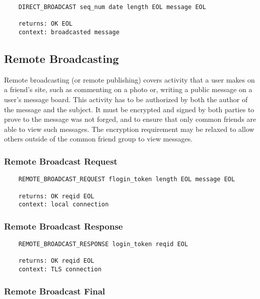 \documentclass[letterpaper,11pt,oneside]{article}
\begin{document}
\vspace{10pt}
\begin{verbatim}
    DIRECT_BROADCAST seq_num date length EOL message EOL

    returns: OK EOL
    context: broadcasted message
\end{verbatim}

\subsection{Remote Broadcasting}

Remote broadcasting (or remote publishing) covers activity that a user makes on
a friend's site, such as commenting on a photo or, writing a public message on
a user's message board. This activity has to be authorized by both the author
of the message and the subject. It must be encrypted and signed by both parties
to prove to the message was not forged, and to ensure that only common friends
are able to view such messages. The encryption requirement may be relaxed to
allow others outside of the common friend group to view messages.

\subsubsection{Remote Broadcast Request}

\vspace{10pt}
\begin{verbatim}
    REMOTE_BROADCAST_REQUEST flogin_token length EOL message EOL

    returns: OK reqid EOL
    context: local connection
\end{verbatim}
\vspace{10pt}

\subsubsection{Remote Broadcast Response}

\vspace{10pt}
\begin{verbatim}
    REMOTE_BROADCAST_RESPONSE login_token reqid EOL 

    returns: OK reqid EOL
    context: TLS connection
\end{verbatim}
\vspace{10pt}

\subsubsection{Remote Broadcast Final}
\end{document}
